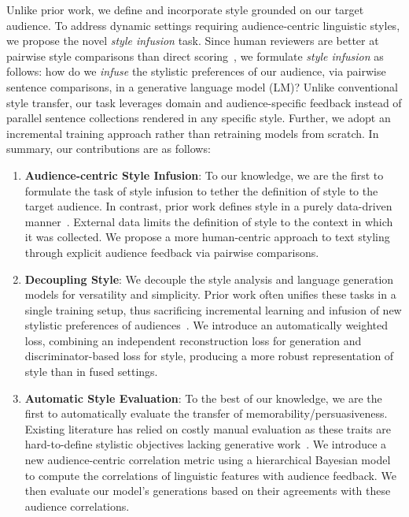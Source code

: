 
Unlike prior work, we define and incorporate style grounded on our target audience. To address dynamic settings requiring audience-centric linguistic styles, we propose the novel \textit{style infusion} task. Since human reviewers are better at pairwise style comparisons than direct scoring~\citep{shah-cardinal-ordinal}, we formulate \textit{style infusion} as follows: how do we \textit{infuse} the stylistic preferences of our audience, via pairwise sentence comparisons, in a generative language model (LM)? Unlike conventional style transfer, our task leverages domain and audience-specific feedback instead of parallel sentence collections rendered in any specific style. Further, we adopt an incremental training approach rather than retraining models from scratch. In summary, our contributions are as follows: 

\begin{enumerate}
    \item \textbf{Audience-centric Style Infusion}: To our knowledge, we are the first to formulate the task of style infusion to tether the definition of style to the target audience. In contrast, prior work defines style in a purely data-driven manner~\citep{shen2017style, yang2018unsupervised}. External data limits the definition of style to the context in which it was collected. We propose a more human-centric approach to text styling through explicit audience feedback via pairwise comparisons.
    
    \item \textbf{Decoupling Style}: We decouple the style analysis and language generation models for versatility and simplicity. Prior work often unifies these tasks in a single training setup, thus sacrificing incremental learning and infusion of new stylistic preferences of audiences~\citep{jain2019unsupervised, jin2019imat}. We introduce an automatically weighted loss, combining an independent reconstruction loss for generation and discriminator-based loss for style, producing a more robust representation of style than in fused settings. 

    \item \textbf{Automatic Style Evaluation}: To the best of our knowledge, we are the first to automatically evaluate the transfer of memorability/persuasiveness. Existing literature has relied on costly manual evaluation as these traits are hard-to-define stylistic objectives lacking generative work~\citep{li2020,tan2016,danescu-niculescu-mizil-etal-2012-hello}. We introduce a new audience-centric correlation metric using a hierarchical Bayesian model to compute the correlations of linguistic features with audience feedback. We then evaluate our model's generations based on their agreements with these audience correlations. 
\end{enumerate}

